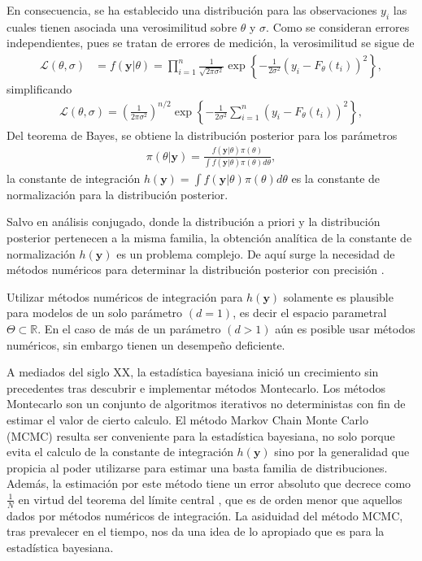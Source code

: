 En consecuencia, se ha establecido una distribución para las observaciones $y_i$ las cuales tienen asociada una verosimilitud sobre $\theta$ y $\sigma$. Como se consideran errores independientes, pues se tratan de errores de medición, la verosimilitud se sigue de
\begin{align*}
    \mathcal{L}(\theta,\sigma) &= f(\mathbf{y}|\theta) = \prod_{i = 1}^{n} \frac{1}{\sqrt{2\pi \sigma^2}} \exp \left \{ -\frac{1}{2\sigma^2}\left(y_i - F_{\theta}(t_i)\right)^2 \right \} , 
\end{align*}
simplificando
\begin{align*}
    \mathcal{L}(\theta,\sigma) = \left(\frac{1}{2\pi \sigma^2}\right) ^{n/2}\exp \left \{  -\frac{1}{2\sigma^2}\sum_{i = 1}^{n} \left(y_i - F_{\theta}(t_i)\right)^2 \right \},
\end{align*}
Del teorema de Bayes, se obtiene la distribución posterior para los parámetros
\begin{align}
    \pi(\theta| \mathbf{y})  = \frac{f(\mathbf{y}|\theta)\pi(\theta)}{\int f(\mathbf{y}|\theta)\pi(\theta)d \theta},
    \label{2.2.04}
\end{align}
la constante de integración $h(\mathbf{y}) = \int f(\mathbf{y}|\theta)\pi(\theta)d \theta$ es la constante de normalización para la distribución posterior. 

Salvo en análisis conjugado, donde la distribución a priori y la distribución posterior pertenecen a la misma familia, la obtención analítica de la constante de normalización $h(\mathbf{y})$ es un problema complejo. De aquí surge la necesidad de métodos numéricos para determinar la distribución posterior con precisión \cite{robert1999monte}. 


Utilizar métodos numéricos de integración para $h(\mathbf{y})$ solamente es plausible para modelos de un solo parámetro $(d=1)$, es decir el espacio parametral $\Theta \subset \mathbb{R}$. En el caso de más de un parámetro $(d > 1)$ aún es posible usar métodos numéricos, sin embargo tienen un desempeño deficiente. 

A mediados del siglo XX, la estadística bayesiana inició un crecimiento sin precedentes tras descubrir e implementar métodos Montecarlo. Los métodos Montecarlo son un conjunto de algoritmos iterativos no deterministas con fin de estimar el valor de cierto calculo. El método Markov Chain Monte Carlo (MCMC) resulta ser conveniente para la estadística bayesiana, no solo porque evita el calculo de la constante de integración $h(\mathbf{y})$ sino por la generalidad que propicia al poder utilizarse para estimar una basta familia de distribuciones. Además, la estimación por este método tiene un error absoluto que decrece como $\frac{1}{N}$ en virtud del teorema del límite central \cite{robert1999monte}, que es de orden menor que aquellos dados por métodos numéricos de integración. La asiduidad del método MCMC, tras prevalecer en el tiempo, nos da una idea de lo apropiado que es para la estadística bayesiana.

